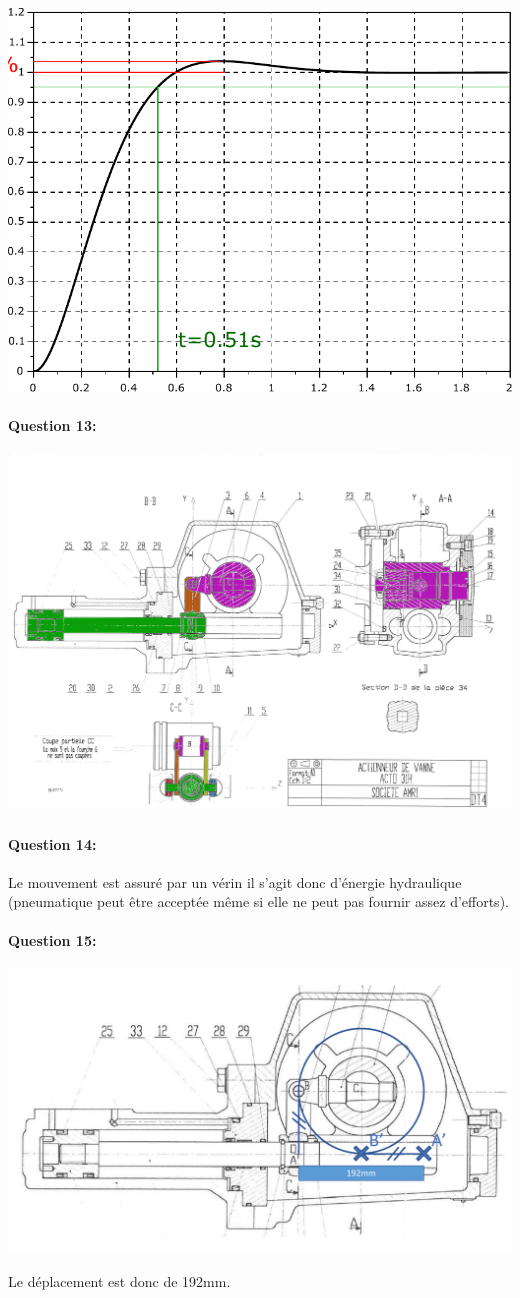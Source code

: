 \begin{center}
 \includegraphics[width=0.8\linewidth]{img/courbe_corrige}
\end{center}

\paragraph{Question 13:} 

\begin{center}
 \includegraphics[width=0.8\linewidth]{img/Actionneur_vanne_corrige}
\end{center}

\paragraph{Question 14:} Le mouvement est assuré par un vérin il s'agit donc d'énergie hydraulique (pneumatique peut être acceptée même si elle ne peut pas fournir assez d'efforts).

\paragraph{Question 15:} 

\begin{center}
 \includegraphics[width=0.8\linewidth]{img/trace_corrige}
\end{center}

Le déplacement est donc de 192mm.



